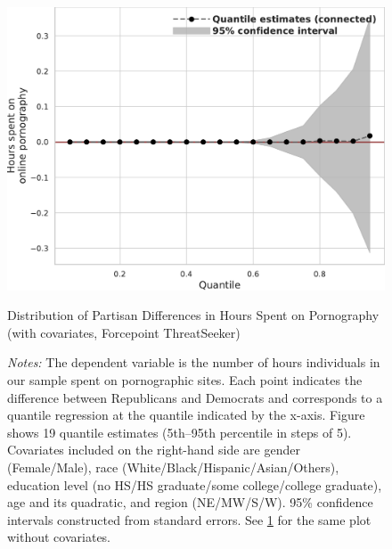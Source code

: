 \documentclass[12pt,twoside]{article}
\begin{document}
\begin{figure}[ht]
	\centering
	\includegraphics[width=.6\linewidth]{figs/forcepoint_quantile_reg_covariates_duration_adult.pdf}
	\caption{Distribution of Partisan Differences in Hours Spent on Pornography (with covariates, Forcepoint ThreatSeeker)}
	\caption*{\footnotesize \emph{Notes:} 
		The dependent variable is the number of hours individuals in our sample spent on pornographic sites.
		Each point indicates the difference between Republicans and Democrats and corresponds to a quantile regression at the quantile indicated by the x-axis.
  Figure shows 19 quantile estimates (5th--95th percentile in steps of 5).
		Covariates included on the right-hand side are gender (Female/Male), race (White/Black/Hispanic/Asian/Others), education level (no HS/HS graduate/some college/college graduate), age and its quadratic, and region (NE/MW/S/W).
		95\% confidence intervals constructed from standard errors.
		See \cref{fig:forcepoint_quantile_regression_duration_covariates} for the same plot without covariates.
	}
	\label{fig:forcepoint_quantile_regression_duration_covariates}
\end{figure}





\FloatBarrier
\clearpage
\end{document}
